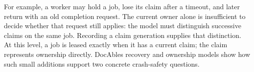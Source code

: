For example, a worker may hold a job, lose its claim after a timeout, and later return with an old completion request. The current owner alone is insufficient to decide whether that request still applies: the model must distinguish successive claims on the same job. Recording a claim generation supplies that distinction. At this level, a job is leased exactly when it has a current claim; the claim represents ownership directly. DocAble\textquotesingle s recovery and ownership models show how such small additions support two concrete crash-safety questions.





